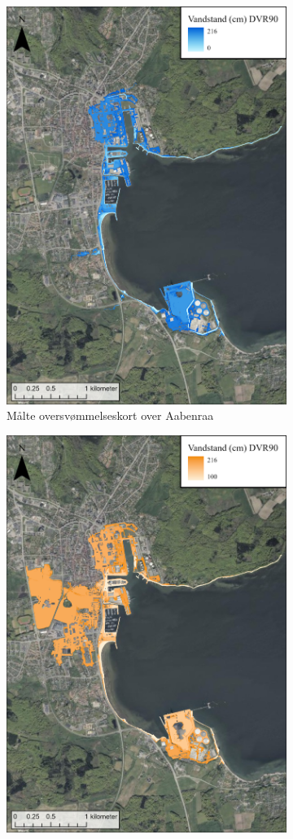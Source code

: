 \begin{figure}[H]
    \begin{subfigure}[t]{0.5\textwidth}
        \centering
        \includegraphics[width=0.8\linewidth]{images/Resultater/2023Malt/2023 resultat_aabenraa.jpg}
        \caption{Målte oversvømmelseskort over Aabenraa}
        \label{Subfig: Målt Aabenraa}
    \end{subfigure}
    \begin{subfigure}[t]{0.5\textwidth}
        \centering
        \includegraphics[width=0.8\linewidth]{images/Resultater/2023Model/2023 model_aabenraa.jpg}

\end{subfigure}
\end{figure}
